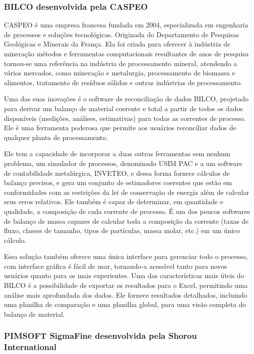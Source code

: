 \subsubsection{BILCO desenvolvida pela CASPEO}

CASPEO é uma empresa francesa fundada em 2004, especializada em engenharia de processos e soluções tecnológicas. Originada do 
Departamento de Pesquisas Geológicas e Minerais da França. Ela foi criada para oferecer à indústria de mineração métodos e ferramentas computacionais resultantes de anos de pesquisa tornou-se uma referência na indústria de processamento mineral, atendendo a vários mercados, como mineração e metalurgia, processamento de biomassa e alimentos, tratamento de resíduos sólidos e outras indústrias de processamento. 

Uma das suas inovações é o software de reconciliação de dados BILCO, projetado para derivar um balanço de material coerente e total a partir de todos os dados disponíveis (medições, análises, estimativas) para todas as correntes de processo. Ele é uma ferramenta poderosa que permite aos usuários reconciliar dados de qualquer planta de processamento.

Ele tem a capacidade de incorporar a duas outras ferramentas sem nenhum problema, um simulador de processos, denominado USIM PAC e a um software de contabilidade metalúrgica, INVETEO, e dessa forma fornece cálculos de balanço precisos, e gera um conjunto de estimadores coerentes que estão em conformidades com as restrições da lei de conservação de energia além de calcular seus erros relativos. Ele também é capaz de determinar, em quantidade e qualidade, a composição de cada corrente de processo. É um dos poucos softwares de balanço de massa capazes de calcular toda a composição da corrente (taxas de fluxo, classes de tamanho, tipos de partículas, massa molar, etc.) em um único cálculo.

Essa solução também oferece uma única interface para gerenciar todo o processo, com interface gráfica é fácil de usar, tornando-a acessível tanto para novos usuários quanto para os mais experientes. Uma das características mais úteis do BILCO é a possibilidade de exportar os resultados para o Excel, permitindo uma análise mais aprofundada dos dados. Ele fornece resultados detalhados, incluindo uma planilha de comparação e uma planilha global, para uma visão completa do balanço de material.

\subsubsection{PIMSOFT SigmaFine desenvolvida pela Shorou International}

